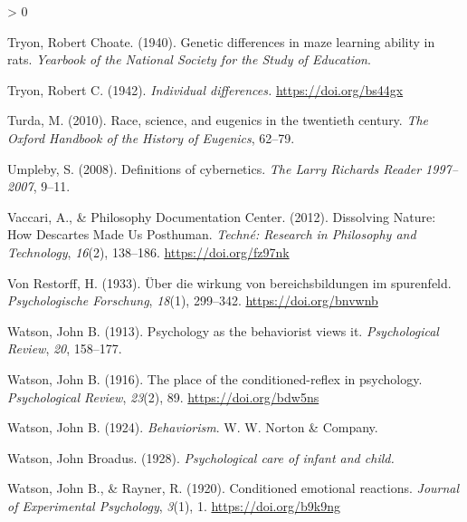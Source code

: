 \documentclass[
  oneside,
  12pt]{crumpbook}
\newlength{\cslhangindent}
\newenvironment{CSLReferences}[2] %
 {%
  \setlength{\parindent}{0pt}
  \ifodd #1 \everypar{\setlength{\hangindent}{\cslhangindent}}\ignorespaces\fi
  \ifnum #2 > 0
  \setlength{\parskip}{#2\baselineskip}
  \fi
 }%
 {}
\begin{document}
\begin{CSLReferences}{1}{0}
\leavevmode\hypertarget{ref-tryonGeneticDifferencesMaze1940}{}%
Tryon, Robert Choate. (1940). Genetic differences in maze learning ability in rats. \emph{Yearbook of the National Society for the Study of Education}.

\leavevmode\hypertarget{ref-tryonIndividualDifferences1942}{}%
Tryon, Robert C. (1942). \emph{Individual differences.} \url{https://doi.org/bs44gx}

\leavevmode\hypertarget{ref-turdaRaceScienceEugenics2010}{}%
Turda, M. (2010). Race, science, and eugenics in the twentieth century. \emph{The Oxford Handbook of the History of Eugenics}, 62--79.

\leavevmode\hypertarget{ref-umplebyDefinitionsCybernetics2008}{}%
Umpleby, S. (2008). Definitions of cybernetics. \emph{The Larry Richards Reader 1997--2007}, 9--11.

\leavevmode\hypertarget{ref-vaccariDissolvingNatureHow2012}{}%
Vaccari, A., \& Philosophy Documentation Center. (2012). Dissolving {Nature}: {How Descartes Made Us Posthuman}. \emph{Techné: Research in Philosophy and Technology}, \emph{16}(2), 138--186. \url{https://doi.org/fz97nk}

\leavevmode\hypertarget{ref-vonrestorffUberWirkungBereichsbildungen1933}{}%
Von Restorff, H. (1933). Über die wirkung von bereichsbildungen im spurenfeld. \emph{Psychologische Forschung}, \emph{18}(1), 299--342. \url{https://doi.org/bnvwnb}

\leavevmode\hypertarget{ref-watsonPsychologyBehavioristViews1913}{}%
Watson, John B. (1913). Psychology as the behaviorist views it. \emph{Psychological Review}, \emph{20}, 158--177.

\leavevmode\hypertarget{ref-watsonPlaceConditionedreflexPsychology1916}{}%
Watson, John B. (1916). The place of the conditioned-reflex in psychology. \emph{Psychological Review}, \emph{23}(2), 89. \url{https://doi.org/bdw5ns}

\leavevmode\hypertarget{ref-watsonBehaviorism1924}{}%
Watson, John B. (1924). \emph{Behaviorism}. {W. W. Norton \& Company}.

\leavevmode\hypertarget{ref-watsonPsychologicalCareInfant1928}{}%
Watson, John Broadus. (1928). \emph{Psychological care of infant and child.}

\leavevmode\hypertarget{ref-watsonConditionedEmotionalReactions1920}{}%
Watson, John B., \& Rayner, R. (1920). Conditioned emotional reactions. \emph{Journal of Experimental Psychology}, \emph{3}(1), 1. \url{https://doi.org/b9k9ng}


\end{CSLReferences}
\end{document}
